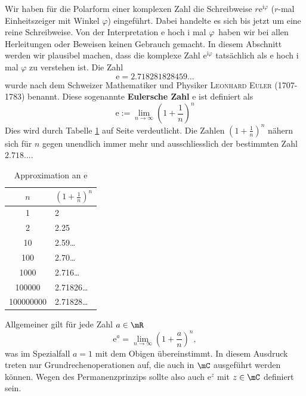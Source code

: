 \documentclass[%
11pt,%
twoside,%
titlepage,%
german,%
headsepline%
]{scrartcl}
\newcommand{\spaltenheight}{\rule{0mm}{3ex}}
\newcommand{\spaltensep}{\\[1ex]}
\begin{document}
Wir haben f\"ur die Polarform einer komplexen Zahl die Schreibweise $r\mathrm{e}^{\mathrm{i}\varphi}$ (\glqq $r$-mal Einheitszeiger mit Winkel $\varphi$\grqq) eingef\"uhrt. Dabei handelte es sich bis jetzt um eine reine Schreibweise. Von der Interpretation \glqq $\mathrm{e}$ hoch $\mathrm{i}$ mal $\varphi$\grqq\ haben wir bei allen Herleitungen oder Beweisen keinen Gebrauch gemacht. In diesem Abschnitt werden wir plausibel machen, dass die komplexe Zahl $\mathrm{e}^{\mathrm{i}\varphi}$ tatsächlich als $\mathrm{e}$ hoch $\mathrm{i}$ mal $\varphi$ zu verstehen ist.
Die Zahl
$$\mathrm{e} = 2.718281828459\dots$$
wurde nach dem Schweizer Mathematiker und Physiker \textsc{Leonhard Euler} (1707-1783) benannt. Diese sogenannte \textbf{Eulersche Zahl} $\mathrm{e}$ ist definiert als
$$\mathrm{e}:=\lim_{n\to\infty}\left(1+\frac{1}{n}\right)^n$$
Dies wird durch Tabelle \ref{tab:e} auf Seite \pageref{tab:e} verdeutlicht. Die Zahlen $(1+\frac{1}{n})^n$ nähern sich f\"ur $n$ gegen unendlich immer mehr und ausschliesslich der bestimmten Zahl $2.718\dots.$
\begin{table}
\begin{center}
\begin{tabular}{|c|l|}
\hline
\rowcolor{lightyellow}\spaltenheight    $n$ & $(1+\frac{1}{n})^n$\spaltensep\hline\hline
\rowcolor{Gray}\spaltenheight 1 & 2\spaltensep\hline
\rowcolor{lightyellow}\spaltenheight    2 & 2.25\spaltensep\hline
\rowcolor{Gray}\spaltenheight 10 & 2.59\dots\spaltensep\hline
\rowcolor{lightyellow}\spaltenheight    100 & 2.70\dots\spaltensep\hline
\rowcolor{Gray}\spaltenheight 1000 & 2.716\dots\spaltensep\hline
\rowcolor{lightyellow}\spaltenheight    100000 & 2.71826\dots\spaltensep\hline
\rowcolor{Gray}\spaltenheight 100000000 & 2.71828\dots\spaltensep\hline
\end{tabular}
\end{center}
\caption{Approximation an $\mathrm{e}$}\label{tab:e}
\end{table}
Allgemeiner gilt f\"ur jede Zahl $a\in\mR$
$$\mathrm{e}^a=\lim_{n\to\infty}\left(1+\frac{a}{n}\right)^n,$$
was im Spezialfall $a=1$ mit dem Obigen \"ubereinstimmt. In diesem Ausdruck treten nur Grundrechenoperationen auf, die auch in $\mC$ ausgef\"uhrt werden k\"onnen. Wegen des Permanenzprinzips sollte also auch $\mathrm{e}^z$ mit $z\in\mC$ definiert sein.
\end{document}
